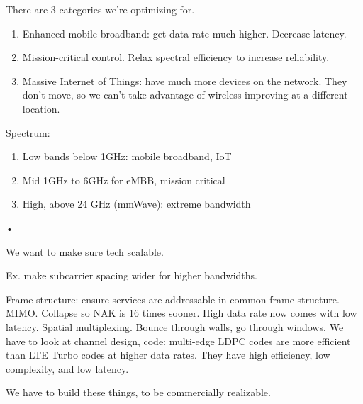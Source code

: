 There are 3 categories we're optimizing for.
\begin{enumerate}
\item
Enhanced mobile broadband: get data rate much higher. Decrease latency.
\item
Mission-critical control. Relax spectral efficiency to increase reliability.
\item
Massive Internet of Things: have much more devices on the network. They don't move, so we can't take advantage of wireless improving at a different location.
\end{enumerate}

Spectrum:
\begin{enumerate}
\item
Low bands below 1GHz: mobile broadband, IoT
\item Mid 1GHz to 6GHz for eMBB, mission critical
\item
High, above 24 GHz (mmWave): extreme bandwidth
\end{enumerate}•

We want to make sure tech scalable.


Ex. make subcarrier spacing wider for higher bandwidths.

Frame structure: ensure services are addressable in common frame structure. MIMO. %
Collapse so NAK is 16 times sooner. High data rate now comes with low latency.
Spatial multiplexing.
Bounce through walls, go through windows.
We have to look at channel design, code: multi-edge LDPC codes are more efficient than LTE Turbo codes at higher data rates. They have high efficiency, low complexity, and low latency.

We have to build these things, to be commercially realizable. %


